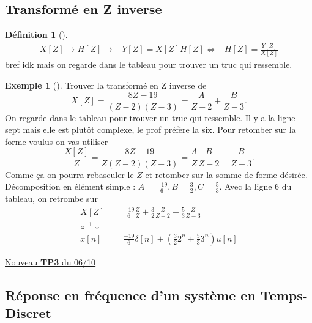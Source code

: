 \documentclass{article}
\theoremstyle{plain}%
\theoremstyle{definition}
\newtheorem{defn}{Définition}[section]
\newtheorem{exmp}{Exemple}[section]
\theoremstyle{remark}
\begin{document}
\subsection{Transformé en Z inverse}
\begin{defn}[]
    \begin{align*}
        X[Z] \to H[Z] \to &Y[Z] = X[Z]H[Z]
       \Leftrightarrow & H[Z] = \frac{Y[Z]}{X[Z]}
    \end{align*}
    bref idk mais on regarde dans le tableau pour trouver un truc qui ressemble.
\end{defn}
\begin{exmp}[]
    Trouver la transformé en Z inverse de 
    \[
        X[Z] = \frac{8Z - 19}{(Z-2)(Z-3)} = \frac{A}{Z-2} + \frac{B}{Z-3}
    .\]
    On regarde dans le tableau pour trouver un truc qui ressemble. Il y a la ligne sept mais elle est plutôt complexe, le prof préfère la six. Pour retomber sur la forme voulus on vas utiliser 
    \[
        \frac{X[Z]}{Z} = \frac{8Z - 19}{Z(Z-2)(Z-3)} = \frac{A}{Z} \frac{B}{Z-2} + \frac{B}{Z-3}
    .\]
    Comme ça on pourra rebasculer le $ Z $ et retomber sur la somme de forme désirée. \\
    Décomposition en élément simple : $ A = \frac{-19}{6}, B = \frac{3}{2}, C = \frac{5}{3} $. Avec la ligne 6 du tableau, on retrombe sur
    \begin{align*}
        X[Z] &= \frac{-19}{6} \frac{Z}{Z} + \frac{3}{2} \frac{Z}{Z-2} + \frac{5}{3} \frac{Z}{Z-3} \\
        z^{-1}\downarrow & \\
        x[n] &= \frac{-19}{6} \delta [n] + (\frac{3}{2}2^n + \frac{5}{3}3^n)u[n]
    \end{align*}
\end{exmp}

\underline{Nouveau \textbf{TP3} du 06/10} \\

\subsection{Réponse en fréquence d'un système en Temps-Discret }
\end{document}
